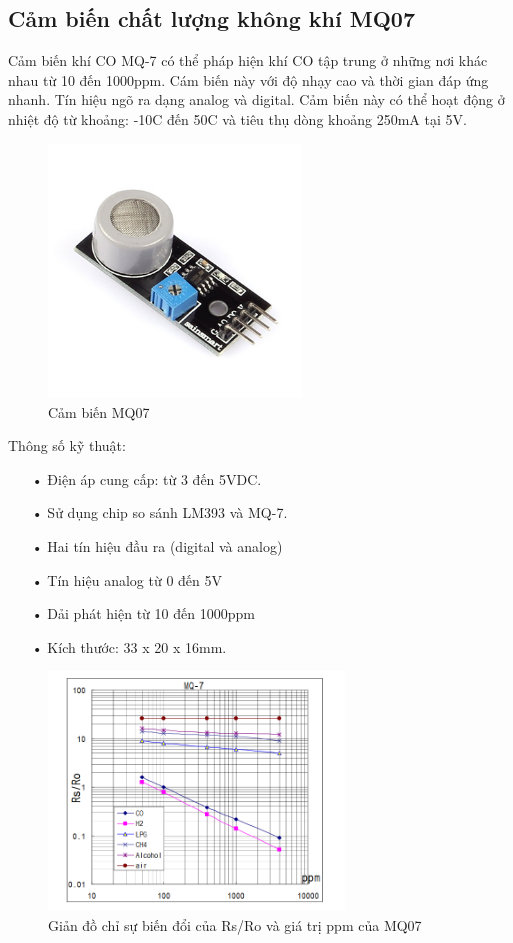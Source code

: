 \subsection{Cảm biến chất lượng không khí MQ07} 
Cảm biến khí CO MQ-7 có thể pháp hiện khí CO tập trung ở những nơi khác nhau từ 10 đến 1000ppm. Cám biến này với độ nhạy cao và thời gian đáp ứng nhanh. Tín hiệu ngõ ra dạng analog và digital. Cảm biến này có thể hoạt động ở nhiệt độ từ khoảng: -10C đến 50C và tiêu thụ dòng khoảng 250mA tại 5V.
\begin{figure}[H]
\centering    
\includegraphics[width=0.6\textwidth]{mq07}
\caption[Cảm biến MQ07]{Cảm biến MQ07}
\label{fig:mq07}
\end{figure}
Thông số kỹ thuật:
\begin{itemize}
\item[•]Điện áp cung cấp: từ 3 đến 5VDC.
\item[•]Sử dụng chip so sánh LM393 và MQ-7.
\item[•]Hai tín hiệu đầu ra (digital và analog)
\item[•]Tín hiệu analog từ 0 đến 5V 
\item[•]Dải phát hiện từ 10 đến 1000ppm
\item[•]Kích thước: 33 x 20 x 16mm.
\end{itemize}
\begin{figure}[H]
\centering    
\includegraphics[width=0.7\textwidth]{mq07_mqh1}
\caption[Giản đồ chỉ sự biến đổi của Rs/Ro và giá trị ppm của MQ07]{Giản đồ chỉ sự biến đổi của Rs/Ro và giá trị ppm của MQ07}
\label{fig:mq07_mqh1}
\end{figure}


